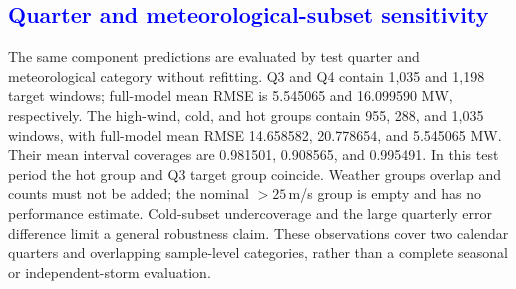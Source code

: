 \subsection{\textcolor{blue}{Quarter and meteorological-subset sensitivity}}
{\color{blue}The same component predictions are evaluated by test quarter and meteorological category without refitting. Q3 and Q4 contain 1,035 and 1,198 target windows; full-model mean RMSE is 5.545065 and 16.099590 MW, respectively. The high-wind, cold, and hot groups contain 955, 288, and 1,035 windows, with full-model mean RMSE 14.658582, 20.778654, and 5.545065 MW. Their mean interval coverages are 0.981501, 0.908565, and 0.995491. In this test period the hot group and Q3 target group coincide. Weather groups overlap and counts must not be added; the nominal $>25$\,m/s group is empty and has no performance estimate. Cold-subset undercoverage and the large quarterly error difference limit a general robustness claim. These observations cover two calendar quarters and overlapping sample-level categories, rather than a complete seasonal or independent-storm evaluation.}

\begin{table}[pos=htbp]
\centering
\color{blue}
\small
\caption{\textcolor{blue}{Component results by test quarter: seed mean [minimum, maximum].}}
\label{tab:chronological_quarter_point}
\end{table}

